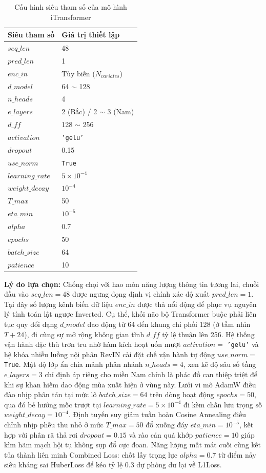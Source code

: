 \begin{table}[H]
    \centering
    \caption{Cấu hình siêu tham số của mô hình iTransformer}
    \label{tab:itrans_params_ch2}
    \renewcommand{\arraystretch}{1.3}
    \begin{tabular}{p{5.5cm} p{8.8cm}}
    \toprule
    \textbf{Siêu tham số} & \textbf{Giá trị thiết lập} \\
    \midrule
    $seq\_len$ & 48 \\
    $pred\_len$ & 1 \\
    $enc\_in$ & Tùy biến ($N_{variates}$) \\
    $d\_model$ & 64 $\sim$ 128 \\
    $n\_heads$ & 4 \\
    $e\_layers$ & 2 (Bắc) / 2 $\sim$ 3 (Nam) \\
    $d\_ff$ & 128 $\sim$ 256 \\
    $activation$ & \texttt{'gelu'} \\
    $dropout$ & 0.15 \\
    $use\_norm$ & \texttt{True} \\
    $learning\_rate$ & $5 \times 10^{-4}$ \\
    $weight\_decay$ & $10^{-4}$ \\
    $T\_max$ & 50 \\
    $eta\_min$ & $10^{-5}$ \\
    $alpha$ & 0.7 \\
    $epochs$ & 50 \\
    $batch\_size$ & 64 \\
    $patience$ & 10 \\
    \bottomrule
    \end{tabular}
\end{table}

\textbf{Lý do lựa chọn:} Chống chọi với hao mòn năng lượng thông tin tương lai, chuỗi đầu vào $seq\_len=48$ được ngưng đọng định vị chính xác độ xuất $pred\_len=1$. Tại đây số lượng kênh biến dữ liệu $enc\_in$ được thả nổi động để phục vụ nguyên lý tính toán lật ngược Inverted. Cụ thể, khối não bộ Transformer buộc phải liên tục quy đổi dạng $d\_model$ dao động từ 64 đến khung chi phối 128 (ở tầm nhìn $T+24$), đi cùng sự mở rộng không gian tĩnh $d\_ff$ tỷ lệ thuận lên 256. Hệ thống vận hành đặc thù trơn tru nhờ hàm kích hoạt uốn mượt $activation=$ \texttt{'gelu'} và hệ khóa nhiễu luồng nội phân RevIN cài đặt chế vận hành tự động $use\_norm=$ \texttt{True}. Mật độ lớp ẩn chia mảnh phân nhánh $n\_heads=4$, xen kẽ độ sâu số tầng $e\_layers = 3$ chỉ định áp riêng cho miền Nam chính là phác đồ can thiệp triệt để khi sự khan hiếm dao động mùa xuất hiện ở vùng này. Lưới vi mô AdamW điều đào nhịp phân tán tại mức lô $batch\_size=64$ trên dòng hoạt động $epochs=50$, qua đó bẻ hướng mốc trượt tại $learning\_rate=5 \times 10^{-4}$ đi kèm chấn lưu trọng số $weight\_decay=10^{-4}$. Định tuyến suy giảm tuần hoàn Cosine Annealing điều chỉnh nhịp phễu thu nhỏ ở mức $T\_max=50$ đổ xuống đáy $eta\_min=10^{-5}$, kết hợp với phân rã thả rơi $dropout=0.15$ và rào cản quá khớp $patience=10$ giúp kìm hãm mạch hội tụ không sụp đổ cực đoan. Năng lượng mất mát cuối cùng kết tủa thành liên minh Combined Loss: chốt lấy trọng lực $alpha=0.7$ từ điểm nảy siêu kháng sai HuberLoss để kéo tỷ lệ 0.3 dự phòng dư lại về L1Loss.


